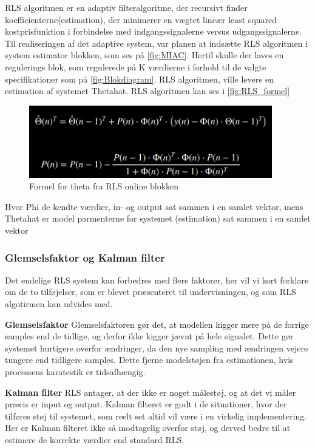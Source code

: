 RLS algoritmen er en adaptiv filteralgoritme, der recursivt finder koefficienterne(estimation), der minimerer en vægtet lineær least squared kostprisfunktion i forbindelse med indgangssignalerne versus udgangssignalerne. Til realiseringen af det adaptive system, var planen at indsætte RLS algoritmen i system estimator blokken, som ses på \autoref{fig:MIAC}. Hertil skulle der laves en regulerings blok, som regulerede på K værdierne i forhold til de valgte specifikationer som på \autoref{fig:Blokdiagram}.
RLS algoritmen, ville levere en estimation af systemet Thetahat. RLS algoritmen kan ses i \autoref{fig:RLS_formel} 


 \begin{figure}[H]
	\centering
	\includegraphics[width = 300pt]{figur/RLS_formel}
	\caption{Formel for theta fra RLS online blokken}
	\label{fig:RLS_formel}
\end{figure}
Hvor Phi de kendte værdier, in- og output sat sammen i en samlet vektor,  mens Thetahat er model parmenterne for systemet (estimation) sat sammen i en samlet vektor 

\subsubsection{Glemselsfaktor og Kalman filter}  
Det endelige RLS system kan forbedres med flere faktorer, her vil vi kort forklare om de to tilføjelser, som er blevet præsenteret til undervisningen, og som RLS algotirmen kan udvides med.

\textbf{Glemselsfaktor}
Glemselsfaktoren gør det, at modellen kigger mere på de forrige samples end de tidlige, og derfor ikke kigger jævnt  på hele signalet. Dette gør systemet hurtigere overfor ændringer, da den nye sampling med ændringen vejere tungere end tidligere samples. Dette fjerne modelstøjen fra estimationen, hvis processens karatestik er tidsafhængig. 

\textbf{Kalman filter}
RLS antager, at der ikke er noget målestøj, og at det vi måler præcis er input og output. Kalman filteret er godt i de situationer, hvor der tilføres støj til systemet, som reelt set altid vil være i en virkelig implementering. Her er Kalman filteret ikke så modtagelig overfor støj, og derved bedre til at estimere de korrekte værdier end standard RLS.

